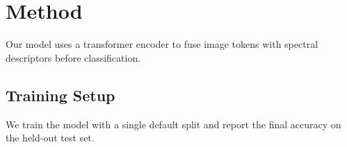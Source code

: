 \section{Method}
Our model uses a transformer encoder to fuse image tokens with spectral descriptors before classification.

\subsection{Training Setup}
We train the model with a single default split and report the final accuracy on the held-out test set.
